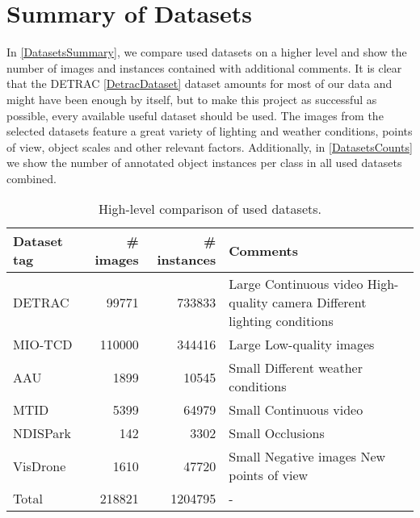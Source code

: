 \section{Summary of Datasets}

In \autoref{DatasetsSummary}, we compare used datasets on a higher level and
show the number of images and instances contained with additional comments. It
is clear that the DETRAC \autoref{DetracDataset} dataset amounts for most of our
data and might have been enough by itself, but to make this project as
successful as possible, every available useful dataset should be used. The
images from the selected datasets feature a great variety of lighting and
weather conditions, points of view, object scales and other relevant factors.
Additionally, in \autoref{DatasetsCounts} we show the number of annotated object
instances per class in all used datasets combined. 


\begin{table}[h]
\centering
\begin{tabular}{|l|rr|p{5cm}|}
    \hline
    Dataset tag & \# images & \# instances & Comments \\
    \hline
    DETRAC      &  \num{99771}  & \num{733833} & Large \newline Continuous video \newline High-quality camera \newline Different lighting conditions \\
    \hline
    MIO-TCD     &  \num{110000} & \num{344416} & Large \newline Low-quality images \\
    \hline
    AAU         &    \num{1899} &  \num{10545} & Small \newline Different weather conditions \\
    \hline
    MTID        &    \num{5399} &  \num{64979} & Small \newline Continuous video \\
    \hline
    NDISPark    &     \num{142} &   \num{3302} & Small \newline Occlusions \\
    \hline
    VisDrone    &    \num{1610} &  \num{47720} & Small \newline Negative images \newline New points of view \\
    \hline
    \hline
    Total       &  \num{218821} & \num{1204795} & - \\
    \hline
\end{tabular}
\caption{High-level comparison of used datasets.}
\label{DatasetsSummary}
\end{table}

